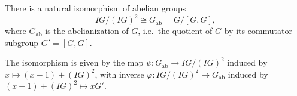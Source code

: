 There is a natural isomorphism of abelian groups
$$IG / (IG)^2 \cong G_{\text{ab}} = G / [G, G],$$
where $G_{\text{ab}}$ is the abelianization of $G$, i.e.\ the quotient of $G$ by its commutator subgroup $G' = [G, G]$.

The isomorphism is given by the map $\psi: G_{\text{ab}} \to IG/(IG)^2$ induced by $x \mapsto (x-1) + (IG)^2$, with inverse $\varphi: IG/(IG)^2 \to G_{\text{ab}}$ induced by $(x-1) + (IG)^2 \mapsto x G'$.
